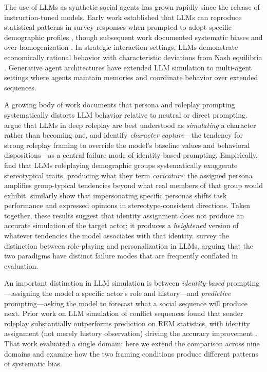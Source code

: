 \documentclass[11pt]{article}
\begin{document}
The use of LLMs as synthetic social agents has grown rapidly since the
release of instruction-tuned models. Early work established that LLMs can
reproduce statistical patterns in survey responses when prompted to adopt
specific demographic profiles \citep{argyle2023out}, though subsequent work
documented systematic biases and over-homogenization
\citep{santurkar2023whose,park2024generative}. In strategic interaction
settings, LLMs demonstrate economically rational behavior with characteristic
deviations from Nash equilibria \citep{horton2023large}. Generative agent
architectures \citep{park2023generative} have extended LLM simulation to
multi-agent settings where agents maintain memories and coordinate behavior
over extended sequences.

A growing body of work documents that persona and roleplay prompting
systematically distorts LLM behavior relative to neutral or direct prompting.
\citet{shanahan2023role} argue that LLMs in deep roleplay are best understood
as \emph{simulating} a character rather than becoming one, and identify
\emph{character capture}---the tendency for strong roleplay framing to
override the model's baseline values and behavioral dispositions---as a
central failure mode of identity-based prompting. Empirically,
\citet{cheng2023compost} find that LLMs roleplaying demographic groups
systematically exaggerate stereotypical traits, producing what they term
\emph{caricature}: the assigned persona amplifies group-typical tendencies
beyond what real members of that group would exhibit.
\citet{salewski2023context} similarly show that impersonating specific
personas shifts task performance and expressed opinions in
stereotype-consistent directions. Taken together, these results suggest that
identity assignment does not produce an accurate simulation of the target
actor; it produces a \emph{heightened} version of whatever tendencies the
model associates with that identity. \citet{tseng2024two} survey the
distinction between role-playing and personalization in LLMs, arguing that
the two paradigms have distinct failure modes that are frequently conflated
in evaluation.

An important distinction in LLM simulation is between \emph{identity-based}
prompting---assigning the model a specific actor's role and history---and
\emph{predictive} prompting---asking the model to forecast what a social
sequence will produce next. Prior work on LLM simulation of conflict
sequences found that sender roleplay substantially outperforms prediction on
REM statistics, with identity assignment (not merely history observation)
driving the accuracy improvement \citep{gibson2024llm}. That work evaluated
a single domain; here we extend the comparison across nine domains and
examine how the two framing conditions produce different patterns of
systematic bias.
\end{document}
